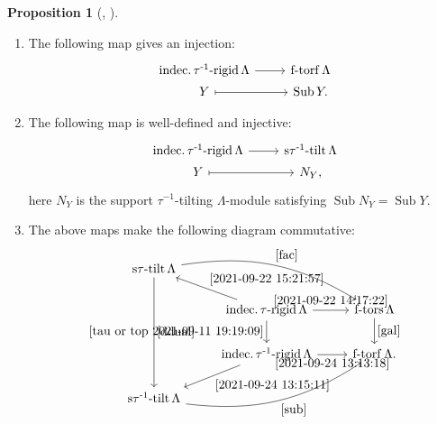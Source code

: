 \documentclass[pdftex,a4paper]{article}
\numberwithin{equation}{subsection}
\theoremstyle{definition}
\newtheorem{proposition}[theorem]{Proposition}
\newcommand{\stautilt}{\operatorname{\mathrm{s\tau-tilt}}}
\newcommand{\itaurigid}{\operatorname{\mathrm{indec.\tau-rigid}}}
\newcommand{\itauirigid}{\operatorname{\mathrm{indec.\tau^{-1}-rigid}}}
\newcommand{\stauitilt}{\operatorname{\mathrm{s\tau^{-1}-tilt}}}
\newcommand{\ftors}{\operatorname{\mathrm{f-tors}}}
\newcommand{\ftorf}{\operatorname{\mathrm{f-torf}}}
\newcommand{\Sub}{\operatorname{\mathrm{Sub}}}
\begin{document}
\begin{proposition}[{\cite[Theorem 5.10]{MR617088}, \cite[Lemma 4.3, Lemma 4,4]{MR3910476}}]
\begin{enumerate}
		\item The following map gives an injection:
		      \begin{equation}\label{2021-09-24 13:13:18}
			      \begin{tikzcd}[row sep=1pt]
				      \itauirigid \Lambda \ar[r] &\ftorf \Lambda\\
				      Y \ar[r,mapsto]& \Sub Y.
			      \end{tikzcd}
		      \end{equation}
		\item The following map is well-defined and injective:
		      \begin{equation}\label{2021-09-24 13:15:11}
			      \begin{tikzcd}[row sep=1pt]
				      \itauirigid \Lambda \ar[r]&\stauitilt \Lambda\\
				      Y\ar[r,mapsto]&N_Y,
			      \end{tikzcd}
		      \end{equation}
		      here \(N_Y\) is the support \(\tau^{-1}\)-tilting \(\Lambda\)-module satisfying \(\Sub N_Y=\Sub Y\).
		\item The above maps make the following diagram commutative:
		      \begin{equation}
			      \begin{tikzcd}
				      \stautilt \Lambda \ar[rd,leftarrow,"\eqref{2021-09-22 15:21:57}"]\ar[rrd,"\eqref{fac}",bend left=20pt]\ar[ddd,"\eqref{ddual}"]&&\\
				      &\itaurigid \Lambda \ar[r,"\eqref{2021-09-22 14:17:22}"] \ar[d,"\eqref{tau or top 2021-09-11 19:19:09}"']&\ftors \Lambda\ar[d,"\eqref{gal}"]\\
				      &\itauirigid \Lambda \ar[r,"\eqref{2021-09-24 13:13:18}"']&\ftorf \Lambda.\\
				      \stauitilt \Lambda\ar[ur,leftarrow,"\eqref{2021-09-24 13:15:11}"']\ar[urr,"\eqref{sub}"',bend right=20pt]&&
			      \end{tikzcd}
		      \end{equation}
	\end{enumerate}
\end{proposition}
\end{document}
